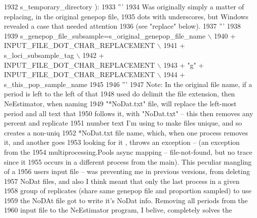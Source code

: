\begin{DoxyCode}
1932                                                     s\_temporary\_directory ):
1933     \textcolor{stringliteral}{'''}
1934 \textcolor{stringliteral}{    Was originally simply a matter of replacing, in the original genepop file,}
1935 \textcolor{stringliteral}{    dots with underscores, but Windows revealed a case that needed attention }
1936 \textcolor{stringliteral}{    (see "replace" below).}
1937 \textcolor{stringliteral}{    '''}
1938 
1939     s\_genepop\_file\_subsample=s\_original\_genepop\_file\_name \(\backslash\)
1940                                 + INPUT\_FILE\_DOT\_CHAR\_REPLACEMENT \(\backslash\)
1941                                 +  s\_loci\_subsample\_tag \(\backslash\)
1942                                 + INPUT\_FILE\_DOT\_CHAR\_REPLACEMENT \(\backslash\)
1943                                 + \textcolor{stringliteral}{"g"} + INPUT\_FILE\_DOT\_CHAR\_REPLACEMENT \(\backslash\)
1944                                 + s\_this\_pop\_sample\_name
1945     
1946     \textcolor{stringliteral}{'''}
1947 \textcolor{stringliteral}{    Note: In the original file name, if a period is left to the left of that}
1948 \textcolor{stringliteral}{    used do delimit the file extension, then NeEstimator, when naming}
1949 \textcolor{stringliteral}{    "*NoDat.txt" file, will replace the left-most period and all text that}
1950 \textcolor{stringliteral}{    follows it,  with "NoDat.txt" -- this then removes any percent and replicate}
1951 \textcolor{stringliteral}{    number text I'm using to make files unique, and so creates a non-uniq}
1952 \textcolor{stringliteral}{    *NoDat.txt file name, which, when one process removes it, and another goes}
1953 \textcolor{stringliteral}{    looking for it , throws an exception -- (an exception from the}
1954 \textcolor{stringliteral}{    multiprocessing.Pools async mapping -- file-not-found, but no trace since it}
1955 \textcolor{stringliteral}{    occurs in a different process from the main).  This peculiar mangling of a}
1956 \textcolor{stringliteral}{    users input file -- was preventing me in previous versions, from deleting}
1957 \textcolor{stringliteral}{    NoDat files, and also I think meant that only the last process in a given}
1958 \textcolor{stringliteral}{    group of replicates (share same genepop file and proportion sampled) to use}
1959 \textcolor{stringliteral}{    the NoDAt file got to write it's NoDat info.  Removing all periods from the}
1960 \textcolor{stringliteral}{    input file to the NeEstimator program, I belive, completely solves the}

\end{DoxyCode}
